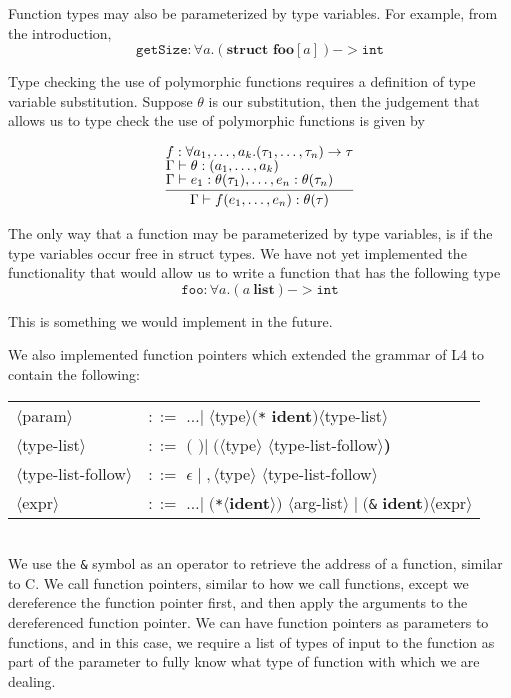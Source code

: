 \documentclass[aps,letterpaper,11pt]{revtex4}
\newcommand{\ttt}[1]{\texttt{#1}}
\newcommand{\bb}[1]{\textbf{#1}}
\begin{document}
Function types may also be parameterized by type variables. For example, from the introduction,
$$\texttt{getSize} : \forall a. (\textbf{struct foo}[a]) -> \texttt{int}$$

Type checking the use of polymorphic functions requires a definition of type variable substitution. Suppose
$\theta$ is our substitution, then the judgement that allows us to type check the use of polymorphic
functions is given by

\[
\begin{tabular}{c}
  \infer{\Gamma \vdash f(e_1, \ldots, e_n) : \theta(\tau)}
        {	
        	{f : \forall a_1, \ldots, a_k. (\tau_1, \ldots, \tau_n) \rightarrow \tau}\\
			{\Gamma \vdash \theta : (a_1, \ldots, a_k)}\\
			{\Gamma \vdash e_1 : \theta(\tau_1), \ldots, e_n : \theta(\tau_n)}
        }
\end{tabular}
\]

The only way that a function may be parameterized by type variables, is if the type variables occur free in
struct types. We have not yet implemented the functionality that would allow us to write a function that
has the following type
$$\texttt{foo} : \forall a. (a~\textbf{list}) -> \texttt{int}$$

This is something we would implement in the future.

We also implemented function pointers which extended the grammar of L4 to
contain the following:\\
\begin{tabular}{ll}
$\langle$param$\rangle$ & $::=$ $\dots|\;\langle$type$\rangle($\ttt{*}
                                 \bb{ident}$)\langle$type-list$\rangle$\\
$\langle$type-list$\rangle$ & $::=$ $\bb{( )} |\;\bb{(}\langle$type$\rangle$
                                     $\langle$type-list-follow$\rangle$\bb{)}\\
$\langle$type-list-follow$\rangle$ & $::=$ $\epsilon\;|\;,\langle$type$\rangle$
                                           $\langle$type-list-follow$\rangle$\\
$\langle$expr$\rangle$ & $::=$ $\dots|\;($\ttt{*}$\langle$\bb{ident}$\rangle)$
                               $\langle$arg-list$\rangle\;|\;($\ttt{\&}
                               \bb{ident}$)\langle$expr$\rangle$\\
\end{tabular}\\
We use the \ttt{\&} symbol as an operator to retrieve the address of a
function, similar to C. We call function pointers, similar to how we call
functions, except we dereference the function pointer first, and then apply
the arguments to the dereferenced function pointer. We can have function
pointers as parameters to functions, and in this case, we require a list of
types of input to the function as part of the parameter to fully know what
type of function with which we are dealing.
\end{document}

